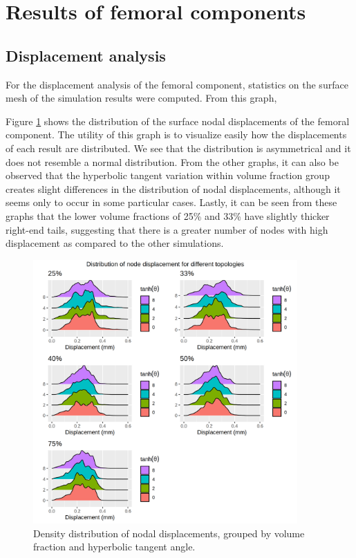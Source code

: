 \documentclass[../main.tex]{subfiles}
\begin{document}
\clearpage

\section{Results of femoral components}

\subsection{Displacement analysis}

For the displacement analysis of the femoral component, statistics on the surface mesh of the simulation results were computed. From this graph,  

Figure \ref{fig:disp_ridges} shows the distribution of the surface nodal displacements of the femoral component. The utility of this graph is to visualize easily how the displacements of each result are distributed. We see that the distribution is asymmetrical and it does not resemble a normal distribution. From the other graphs, it can also be observed that the hyperbolic tangent variation within volume fraction group creates slight differences in the distribution of nodal displacements, although it seems only to occur in some particular cases. Lastly, it can be seen from these graphs that the lower volume fractions of 25\% and 33\% have slightly thicker right-end tails, suggesting that there is a greater number of nodes with high displacement as compared to the other simulations.

\begin{figure}[h!]
  \centering
  \includegraphics[width=0.9\textwidth]{images/results/plots/femoral/displacement/disp_density_ridges.png}
  \caption{Density distribution of nodal displacements, grouped by volume fraction and hyperbolic tangent angle.}
  \label{fig:disp_ridges}
\end{figure}
\end{document}
